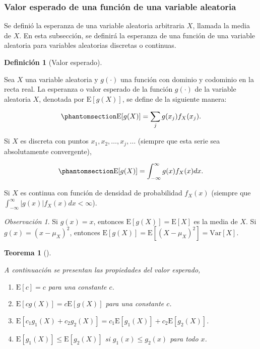\documentclass[
  us-letterpaper,
]{scrreprt}
\theoremstyle{plain}
\theoremstyle{definition}
\newtheorem{definition}{Definición}[chapter]
\theoremstyle{definition}
\theoremstyle{plain}
\newtheorem{theorem}{Teorema}[chapter]
\theoremstyle{remark}
\newtheorem*{remark}{Observación}
\begin{document}
\subsubsection{Valor esperado de una función de una variable
aleatoria}\label{valor-esperado-de-una-funciuxf3n-de-una-variable-aleatoria}

Se definió la esperanza de una variable aleatoria arbitraria \(X\),
llamada la media de \(X\). En esta subsección, se definirá la esperanza
de una función de una variable aleatoria para variables aleatorias
discretas o continuas.

\begin{definition}[Valor
esperado]\protect\hypertarget{def-VE}{}\label{def-VE}

Sea \(X\) una variable aleatoria y \(g(\cdot)\) una función con dominio
y codominio en la recta real. La esperanza o valor esperado de la
función \(g(\cdot)\) de la variable aleatoria \(X\), denotada por
\(\mathrm E[g(X)]\), se define de la siguiente manera:

\begin{equation}\phantomsection\label{eq-VE1}{ \mathrm E[g(X)]=\sum_j g(x_j)f_X(x_j). }\end{equation}

Si \(X\) es discreta con puntos \(x_1, x_2, \ldots, x_j, \ldots\)
(siempre que esta serie sea absolutamente convergente),

\begin{equation}\phantomsection\label{eq-VE2}{ \mathrm E[g(X)]=\int_{-\infty}^\infty g(x)f_X(x)dx.}\end{equation}

Si \(X\) es continua con función de densidad de probabilidad \(f_X(x)\)
(siempre que \(\int_{-\infty}^\infty |g(x)|f_X(x)dx < \infty\)).

\end{definition}

\begin{remark}
Si \(g(x)=x\), entonces \(\mathrm E[g(X)]=\mathrm E[X]\) es la media de
\(X\). Si \(g(x)=(x-\mu_X)^2\), entonces
\(\mathrm E[g(X)]=\mathrm E[(X-\mu_X)^2]=\mathrm{Var}[X]\).
\end{remark}

\begin{theorem}[]\protect\hypertarget{thm-propve}{}\label{thm-propve}

A continuación se presentan las propiedades del valor esperado,

\begin{enumerate}
\def\labelenumi{\roman{enumi}.}
\item
  \(\mathrm E[c]=c\) para una constante \(c\).
\item
  \(\mathrm E[cg(X)]=c\mathrm E[g(X)]\) para una constante \(c\).
\item
  \(\mathrm E[c_1 g_1(X)+c_2 g_2(X)]=c_1\mathrm E[g_1(X)]+c_2\mathrm E[g_2(X)]\).
\item
  \(\mathrm E[g_1(X)]\leq \mathrm E[g_2(X)]\) si \(g_1(x)\leq g_2(x)\)
  para todo \(x\).
\end{enumerate}

\end{theorem}
\end{document}
